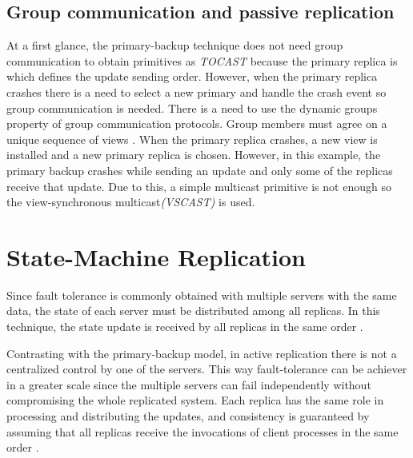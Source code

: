 

\subsection{Group communication and passive replication}

At a first glance, the primary-backup technique does not need group communication to obtain primitives as \textit{TOCAST} because the primary replica is which defines the update sending order. However, when the primary replica crashes there is a need to select a new primary and handle the crash event so group communication is needed. There is a need to use the dynamic groups property of group communication protocols. Group members must agree on a unique sequence of views \cite{Guerraoui:1997p555}. 
When the primary replica crashes, a new view is installed and a new primary replica is chosen. However, in this example, the primary backup crashes while sending an update and only some of the replicas receive that update. Due to this, a simple multicast primitive is not enough so the view-synchronous multicast\textit{(VSCAST)} is used.

\section{State-Machine Replication}

Since fault tolerance is commonly obtained with multiple servers with the same data, the state of each server must be distributed among all replicas. In this technique, the state update is received by all replicas in the same order \cite{Guerraoui96fault-toleranceby}.

Contrasting with the primary-backup model, in active replication there is not a centralized control by one of the servers. This way fault-tolerance can be achiever in a greater scale since the multiple servers can fail independently without compromising the whole replicated system. Each replica has the same role in processing and distributing the updates, and consistency is guaranteed by assuming that all replicas receive the invocations of client processes in the same order \cite{Guerraoui:1997p555}.

